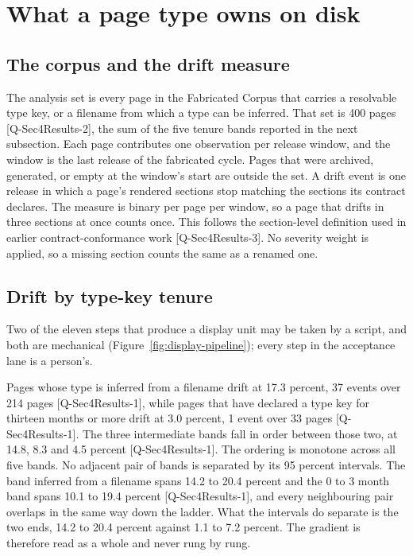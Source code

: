 
\section{What a page type owns on disk}

\subsection{The corpus and the drift measure}
The analysis set is every page in the Fabricated Corpus that carries a resolvable type key, or a filename from which a type can be inferred. That set is 400 pages [Q-Sec4Results-2], the sum of the five tenure bands reported in the next subsection. Each page contributes one observation per release window, and the window is the last release of the fabricated cycle. Pages that were archived, generated, or empty at the window's start are outside the set.
A drift event is one release in which a page's rendered sections stop matching the sections its contract declares. The measure is binary per page per window, so a page that drifts in three sections at once counts once. This follows the section-level definition used in earlier contract-conformance work \cite{TOADD} [Q-Sec4Results-3]. No severity weight is applied, so a missing section counts the same as a renamed one.

\subsection{Drift by type-key tenure}
Two of the eleven steps that produce a display unit may be taken by a script, and both are mechanical (Figure~\ref{fig:display-pipeline}); every step in the acceptance lane is a person's.

Pages whose type is inferred from a filename drift at 17.3 percent, 37 events over 214 pages [Q-Sec4Results-1], while pages that have declared a type key for thirteen months or more drift at 3.0 percent, 1 event over 33 pages [Q-Sec4Results-1]. The three intermediate bands fall in order between those two, at 14.8, 8.3 and 4.5 percent [Q-Sec4Results-1]. The ordering is monotone across all five bands.
No adjacent pair of bands is separated by its 95 percent intervals. The band inferred from a filename spans 14.2 to 20.4 percent and the 0 to 3 month band spans 10.1 to 19.4 percent [Q-Sec4Results-1], and every neighbouring pair overlaps in the same way down the ladder. What the intervals do separate is the two ends, 14.2 to 20.4 percent against 1.1 to 7.2 percent. The gradient is therefore read as a whole and never rung by rung.

